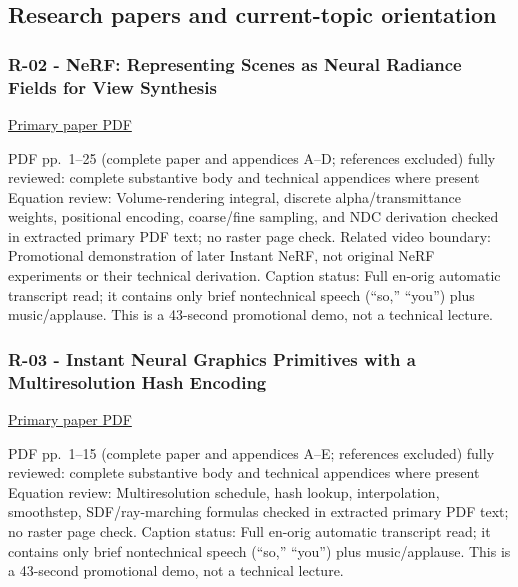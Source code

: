 \subsection{Research papers and current-topic orientation}\label{04-visual-computing-ii-ch036-research-papers-and-current-topic-orientation}

\hypertarget{04-visual-computing-ii-ch036-research-papers-and-current-topic-orientation}{}

\subsubsection{R-02 - NeRF: Representing Scenes as Neural Radiance Fields for View Synthesis}\label{04-visual-computing-ii-ch036-r-02---nerf-representing-scenes-as-neural-radiance-fields-for-view-synthesis}

\hypertarget{04-visual-computing-ii-ch036-r-02---nerf-representing-scenes-as-neural-radiance-fields-for-view-synthesis}{}

\href{https://arxiv.org/pdf/2003.08934}{Primary paper PDF}

PDF pp.~1--25 (complete paper and appendices A--D; references excluded) fully reviewed: complete substantive body and technical appendices where present Equation review: Volume-rendering integral, discrete alpha/transmittance weights, positional encoding, coarse/fine sampling, and NDC derivation checked in extracted primary PDF text; no raster page check. Related video boundary: Promotional demonstration of later Instant NeRF, not original NeRF experiments or their technical derivation. Caption status: Full en-orig automatic transcript read; it contains only brief nontechnical speech (``so,'' ``you'') plus music/applause. This is a 43-second promotional demo, not a technical lecture.

\subsubsection{R-03 - Instant Neural Graphics Primitives with a Multiresolution Hash Encoding}\label{04-visual-computing-ii-ch036-r-03---instant-neural-graphics-primitives-with-a-multiresolution-hash-encoding}

\hypertarget{04-visual-computing-ii-ch036-r-03---instant-neural-graphics-primitives-with-a-multiresolution-hash-encoding}{}

\href{https://nvlabs.github.io/instant-ngp/assets/mueller2022instant.pdf}{Primary paper PDF}

PDF pp.~1--15 (complete paper and appendices A--E; references excluded) fully reviewed: complete substantive body and technical appendices where present Equation review: Multiresolution schedule, hash lookup, interpolation, smoothstep, SDF/ray-marching formulas checked in extracted primary PDF text; no raster page check. Caption status: Full en-orig automatic transcript read; it contains only brief nontechnical speech (``so,'' ``you'') plus music/applause. This is a 43-second promotional demo, not a technical lecture.

